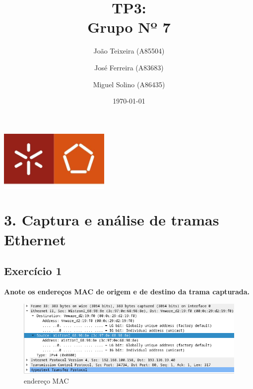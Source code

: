 \documentclass[a4paper]{report}
\begin{document}
\title{TP3:\\ 
\large Grupo Nº 7}
\author{João Teixeira (A85504) \and José Ferreira (A83683) \and Miguel Solino (A86435)}

\date{\today}

\begin{center}
    \begin{minipage}{0.75\linewidth}
        \centering
        \includegraphics[width=0.4\textwidth]{images/eng.jpeg}\par\vspace{1cm}
        \vspace{1cm}
        \href{https://www.uminho.pt/PT}
        {\color{black}{\scshape\LARGE Universidade do Minho}} \par
        \vspace{1cm}
        \href{https://www.di.uminho.pt/}
        {\color{black}{\scshape\Large Departamento de Informática}} \par
        \maketitle
    \end{minipage}
\end{center}

\tableofcontents

\chapter{3. Captura e análise de tramas Ethernet }
\section{Exercício 1}
\textbf{Anote os endereços MAC de origem e de destino da trama capturada.}

\begin{figure}[H]
    \centering 
    \includegraphics[width=\textwidth]{images/macAdress1.png}  
    \caption{endereço MAC}
    \label{fig:macAdress1}
\end{figure}
\end{document}
